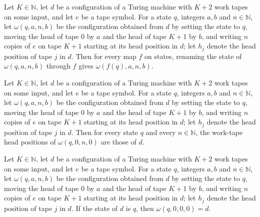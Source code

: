\begin{lemma}
\label{Turing.cw_cfg_mapState}
\leanok
{}
Let $K\in\mathbb{N}$, let $d$ be a configuration of a Turing machine with $K+2$ work tapes on
some input, and let $e$ be a tape symbol. For a state $q$, integers $a,b$ and $n\in\mathbb{N}$,
let $\omega(q,a,n,b)$ be the configuration obtained from $d$ by setting the state to $q$,
moving the head of tape $0$ by $a$ and the head of tape $K+1$ by $b$, and writing $n$ copies of
$e$ on tape $K+1$ starting at its head position in $d$; let $h_j$ denote the head position of
tape $j$ in $d$. Then for every map $f$ on states, renaming the state of $\omega(q,a,n,b)$
through $f$ gives $\omega(f(q),a,n,b)$.
\end{lemma}

\begin{lemma}
\label{Turing.cw_cfg_pos_zero}
\leanok
{}
Let $K\in\mathbb{N}$, let $d$ be a configuration of a Turing machine with $K+2$ work tapes on
some input, and let $e$ be a tape symbol. For a state $q$, integers $a,b$ and $n\in\mathbb{N}$,
let $\omega(q,a,n,b)$ be the configuration obtained from $d$ by setting the state to $q$,
moving the head of tape $0$ by $a$ and the head of tape $K+1$ by $b$, and writing $n$ copies of
$e$ on tape $K+1$ starting at its head position in $d$; let $h_j$ denote the head position of
tape $j$ in $d$. Then for every state $q$ and every $n\in\mathbb{N}$, the work-tape head
positions of $\omega(q,0,n,0)$ are those of $d$.
\end{lemma}

\begin{lemma}
\label{Turing.cw_cfg_zero}
\leanok
{}
Let $K\in\mathbb{N}$, let $d$ be a configuration of a Turing machine with $K+2$ work tapes on
some input, and let $e$ be a tape symbol. For a state $q$, integers $a,b$ and $n\in\mathbb{N}$,
let $\omega(q,a,n,b)$ be the configuration obtained from $d$ by setting the state to $q$,
moving the head of tape $0$ by $a$ and the head of tape $K+1$ by $b$, and writing $n$ copies of
$e$ on tape $K+1$ starting at its head position in $d$; let $h_j$ denote the head position of
tape $j$ in $d$. If the state of $d$ is $q$, then $\omega(q,0,0,0)=d$.
\end{lemma}

